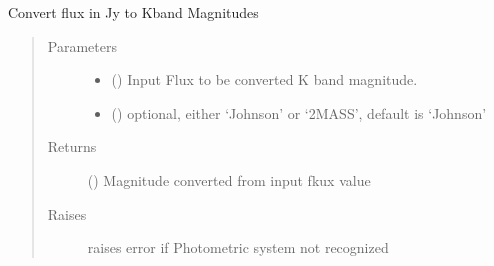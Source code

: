 \documentclass[a4paper,10pt,english]{sphinxmanual}
\begin{document}
\begin{fulllineitems}
\label{\detokenize{cascade.exoplanet_tools:cascade.exoplanet_tools.exoplanet_tools.JytoKmag}}
Convert flux in Jy to Kband Magnitudes
\begin{quote}\begin{description}
\item[{Parameters}] \leavevmode\begin{itemize}
\item {} 
 (\sphinxstyleliteralemphasis{\sphinxupquote{, }}) \textendash{} Input Flux to be converted K band magnitude.

\item {} 
 () \textendash{} optional, either ‘Johnson’ or ‘2MASS’, default is ‘Johnson’

\end{itemize}

\item[{Returns}] \leavevmode
{} () \textendash{} Magnitude  converted from input fkux value

\item[{Raises}] \leavevmode
{} \textendash{} raises error if Photometric system not recognized

\end{description}\end{quote}

\end{fulllineitems}

\end{document}
